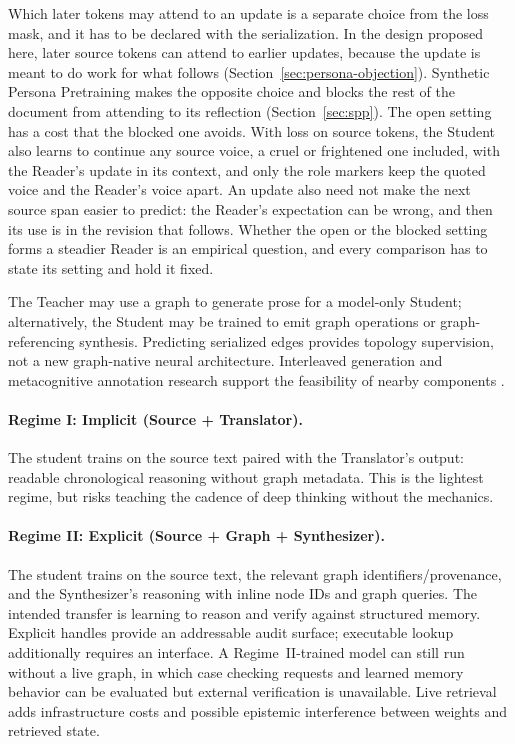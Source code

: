 \documentclass[11pt]{article}
\begin{document}
Which later tokens may attend to an update is a separate choice from the loss
mask, and it has to be declared with the serialization. In the design proposed
here, later source tokens can attend to earlier updates, because the update is
meant to do work for what follows (Section~\ref{sec:persona-objection}).
Synthetic Persona Pretraining makes the opposite choice and blocks the rest of
the document from attending to its reflection (Section~\ref{sec:spp}). The open
setting has a cost that the blocked one avoids. With loss on source tokens, the
Student also learns to continue any source voice, a cruel or frightened one
included, with the Reader's update in its context, and only the role markers
keep the quoted voice and the Reader's voice apart. An update also need not
make the next source span easier to predict: the Reader's expectation can be
wrong, and then its use is in the revision that follows. Whether the open or
the blocked setting forms a steadier Reader is an empirical question, and every
comparison has to state its setting and hold it fixed.

The Teacher may use a graph to generate prose for a model-only Student;
alternatively, the Student may be trained to emit graph operations or
graph-referencing synthesis. Predicting serialized edges provides topology
supervision, not a new graph-native neural architecture. Interleaved generation
and metacognitive annotation research support the feasibility of nearby
components \cite{xie2025interleaved,didolkar2024metacognitive,korbak2023pretraining}.

\paragraph{Regime I: Implicit (Source + Translator).} The student trains on the
source text paired with the Translator's output: readable chronological
reasoning without graph metadata. This is the lightest regime, but risks
teaching the cadence of deep thinking without the mechanics.

\paragraph{Regime II: Explicit (Source + Graph + Synthesizer).} The student
trains on the source text, the relevant graph identifiers/provenance, and the
Synthesizer's reasoning with inline node IDs and graph queries. The intended transfer is learning to
reason and verify against structured memory. Explicit handles provide an
addressable audit surface; executable lookup additionally requires an
interface. A Regime~II-trained model can still run without a live graph, in
which case checking requests and learned memory behavior can be evaluated but
external verification is unavailable. Live retrieval adds infrastructure costs
and possible epistemic interference between weights and retrieved state.
\end{document}

